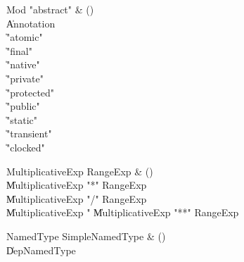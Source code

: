 \begin{bbgrammar}

Mod \label{prod:Mod}  \: \xcd"abstract" & () \\

    \| Annotation \\
    \| \xcd"atomic" \\
    \| \xcd"final" \\
    \| \xcd"native" \\
    \| \xcd"private" \\
    \| \xcd"protected" \\
    \| \xcd"public" \\
    \| \xcd"static" \\
    \| \xcd"transient" \\
    \| \xcd"clocked" \\

\end{bbgrammar}

\begin{bbgrammar}

MultiplicativeExp \label{prod:MultiplicativeExp}  \: RangeExp & () \\

    \| MultiplicativeExp \xcd"*" RangeExp \\
    \| MultiplicativeExp \xcd"/" RangeExp \\
    \| MultiplicativeExp \xcd"%
    \| MultiplicativeExp \xcd"**" RangeExp \\

\end{bbgrammar}

\begin{bbgrammar}

NamedType \label{prod:NamedType}  \: SimpleNamedType & () \\

    \| DepNamedType \\

\end{bbgrammar}


